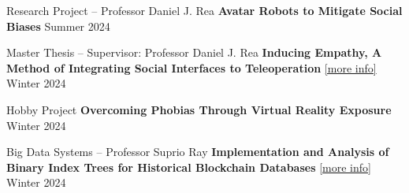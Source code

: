
\begin{cventries}

    \cventry
    {Research Project -- Professor Daniel J. Rea}
    {\textbf {Avatar Robots to Mitigate Social Biases}}
    {}
    {Summer 2024}
    {}
    \vspace{0.0 cm}

  \end{cventries}
  \begin{cventries}
  
    \cventry
    {Master Thesis -- Supervisor: Professor Daniel J. Rea}
    {\textbf {Inducing Empathy, A Method of Integrating Social Interfaces to Teleoperation}
    \href{https://github.com/ph504/Teleoperation-Interface}{\textcolor{cobalt}{[more info]}}}
    {}
    {Winter 2024}
    {}
    \vspace{0.0 cm}
  \end{cventries}
  \begin{cventries}
    \cventry
    {Hobby Project}
    {\textbf {Overcoming Phobias Through Virtual Reality Exposure}}
    {}
    {Winter 2024}
    {}
    \vspace{0.0 cm}

  \end{cventries}
  \begin{cventries}
    \cventry
    {Big Data Systems -- Professor Suprio Ray}
    {\textbf {Implementation and Analysis of Binary Index Trees for Historical Blockchain Databases}
    \href{https://github.com/ph504/avl-blockchain}{\textcolor{cobalt}{[more info]}}}
    {}
    {Winter 2024}
    {}
    \vspace{0.0 cm}
  
  \end{cventries}
